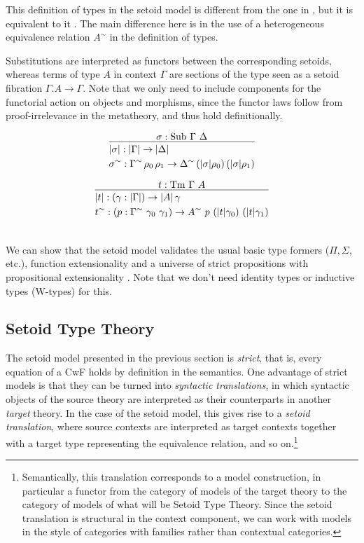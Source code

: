\documentclass[autoref]{llncs}
\newcommand{\GG}{\Gamma}
\newcommand{\GD}{\Delta}
\newcommand{\Tm}{\mathrm{Tm}}
\newcommand{\Sub}{\mathrm{Sub}}
\begin{document}
This definition of types in the setoid model is different from the one in
\cite{setoid99}, but it is equivalent to it \cite[Section 1.6.1]{simonthesis}. The main
difference here is in the use of a heterogeneous equivalence relation $A^\sim$
in the definition of types.

Substitutions are interpreted as functors between the corresponding setoids,
whereas terms of type $A$ in context $\GG$ are sections of the type seen as a
setoid fibration $\GG . A \to \GG$. Note that we only need to include components
for the functorial action on objects and morphisms, since the functor laws
follow from proof-irrelevance in the metatheory, and thus hold definitionally.
\\
\begin{minipage}{0.5\textwidth}
\[
\infer{
  \begin{aligned}
    & | \sigma | : | \GG | \to | \GD | \\
    & \sigma^\sim : \GG^\sim\, \rho_0\, \rho_1 \to \GD^\sim\, (|\sigma|\rho_0)\, (|\sigma|\rho_1)
  \end{aligned}
}{
  \sigma : \Sub\ \GG\ \GD
}
\]
\end{minipage}
\begin{minipage}{0.5\textwidth}
\[
\infer{
  \begin{aligned}
    & | t | : (\gamma : | \GG |) \to | A | \, \gamma \\
    & t^\sim : (p : \GG^\sim\ \gamma_0\ \gamma_1) \to A^\sim\ p\ (|t|\gamma_0)\ (|t|\gamma_1)
  \end{aligned}
}{
  t : \Tm\ \GG\ A
}
\]
\end{minipage}
\\

We can show that the setoid model validates the usual basic type formers ($\Pi,
\Sigma$, etc.), function extensionality and a universe of strict
propositions with propositional extensionality \cite{setoid99}. Note that
we don't need identity types or inductive types (W-types) for this.

\subsection{Setoid Type Theory}\label{sett}

The setoid model presented in the previous section is \emph{strict}, that is,
every equation of a CwF holds by definition in the semantics. One advantage of
strict models is that they can be turned into \emph{syntactic translations}, in
which syntactic objects of the source theory are interpreted as their
counterparts in another \emph{target} theory. In the case of the setoid model,
this gives rise to a \emph{setoid translation}, where source contexts are
interpreted as target contexts together with a target type representing the
equivalence relation, and so on.\footnote{%
Semantically, this translation corresponds to a model construction, in
particular a functor from the category of models of the target theory to the
category of models of what will be Setoid Type Theory.  Since the setoid
translation is structural in the context component, we can work with models in
the style of categories with families rather than contextual categories.
}
\end{document}
